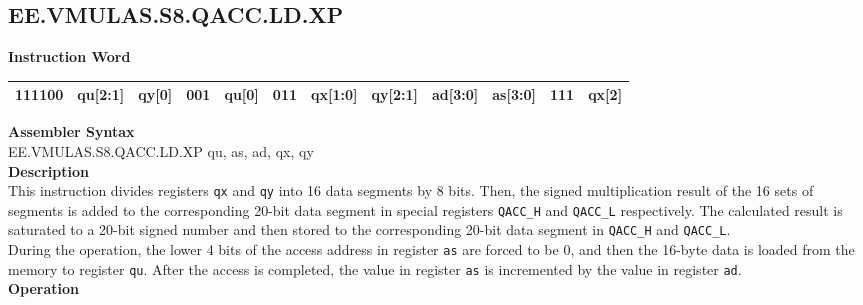 \clearpage
\subsection{EE.VMULAS.S8.QACC.LD.XP}\label{instruction:EEVMULASS8QACCLDXP}
\setlength\tabcolsep{6pt}
\textbf{Instruction Word} \\
\begin{tabular}{|c|c|c|c|c|c|c|c|c|c|c|c|}
	\hline
	111100 & qu[2:1] & qy[0] & 001 & qu[0] & 011 & qx[1:0] & qy[2:1] & ad[3:0] & as[3:0] & 111 & qx[2] \\
	\hline
\end{tabular}

\textbf{Assembler Syntax} \\
EE.VMULAS.S8.QACC.LD.XP qu, as, ad, qx, qy \\
\textbf{Description} \\
This instruction divides registers \lstinline{qx} and \lstinline{qy} into 16 data segments by 8 bits. Then, the signed multiplication result of the 16 sets of segments is added to the corresponding 20-bit data segment in special registers \lstinline{QACC_H} and \lstinline{QACC_L} respectively. The calculated result is saturated to a 20-bit signed number and then stored to the corresponding 20-bit data segment in \lstinline{QACC_H} and \lstinline{QACC_L}.\\
During the operation, the lower 4 bits of the access address in register \lstinline{as} are forced to be 0, and then the 16-byte data is loaded from the memory to register \lstinline{qu}. After the access is completed, the value in register \lstinline{as} is incremented by the value in register \lstinline{ad}.\\
\textbf{Operation}
